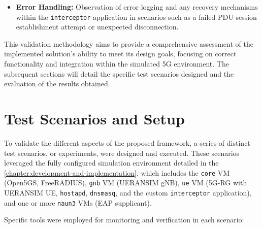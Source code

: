 \begin{enumerate}
{\begin{itemize}
            \item \textbf{Error Handling:} Observation of error logging and any recovery mechanisms within the \texttt{interceptor} application in scenarios such as a failed \ac{PDU} session establishment attempt or unexpected disconnection.
        \end{itemize}
    }
\end{enumerate}

This validation methodology aims to provide a comprehensive assessment of the implemented solution's ability to meet its design goals, focusing on correct functionality and integration within the simulated \ac{5G} environment. The subsequent sections will detail the specific test scenarios designed and the evaluation of the results obtained.

\section{Test Scenarios and Setup}

To validate the different aspects of the proposed framework, a series of distinct test scenarios, or experiments, were designed and executed. These scenarios leveraged the fully configured simulation environment detailed in the \ref{chapter:development-and-implementation}, which includes the \texttt{core} \ac{VM} (Open5GS, FreeRADIUS), \texttt{gnb} \ac{VM} (UERANSIM gNB), \texttt{ue} \ac{VM} (5G-RG with UERANSIM UE, \texttt{hostapd}, \texttt{dnsmasq}, and the custom \texttt{interceptor} application), and one or more \texttt{naun3} \acp{VM} (\ac{EAP} supplicant).

Specific tools were employed for monitoring and verification in each scenario:

